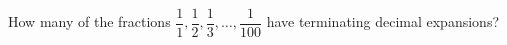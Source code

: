 How many of the fractions $\dfrac11,\dfrac12,\dfrac13,\ldots,\dfrac1{100}$ have terminating decimal expansions?
